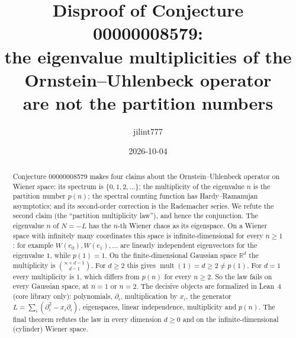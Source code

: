\documentclass[11pt]{article}
\title{Disproof of Conjecture 00000008579:\\
the eigenvalue multiplicities of the Ornstein--Uhlenbeck operator\\
are not the partition numbers}
\author{jilint777}
\date{2026-10-04}
\theoremstyle{definition}
\theoremstyle{remark}
\newcommand{\R}{\mathbb{R}}
\newcommand{\mult}{\operatorname{mult}}
\begin{document}
\sloppy
\maketitle

\begin{abstract}
Conjecture 00000008579 makes four claims about the Ornstein--Uhlenbeck operator
on Wiener space: its spectrum is $\{0,1,2,\dots\}$; the multiplicity of the
eigenvalue $n$ is the partition number $p(n)$; the spectral counting function has
Hardy--Ramanujan asymptotics; and its second-order correction is the Rademacher
series. We refute the second claim (the ``partition multiplicity law''), and hence
the conjunction. The eigenvalue $n$ of $N=-L$ has the $n$-th Wiener chaos as its
eigenspace. On a Wiener space with infinitely many coordinates this space is
infinite-dimensional for every $n\ge1$: for example $W(e_0),W(e_1),\dots$ are
linearly independent eigenvectors for the eigenvalue $1$, while $p(1)=1$. On the
finite-dimensional Gaussian space $\R^d$ the multiplicity is $\binom{n+d-1}{d-1}$.
For $d\ge2$ this gives $\mult(1)=d\ge2\ne p(1)$. For $d=1$ every multiplicity is
$1$, which differs from $p(n)$ for every $n\ge2$. So the law fails on every
Gaussian space, at $n=1$ or $n=2$. The decisive objects are formalized in Lean~4
(core library only): polynomials, $\partial_i$, multiplication by $x_i$, the
generator $L=\sum_i(\partial_i^2-x_i\partial_i)$, eigenspaces, linear independence,
multiplicity and $p(n)$. The final theorem refutes the law in every dimension
$d\ge0$ and on the infinite-dimensional (cylinder) Wiener space.
\end{abstract}
\end{document}
